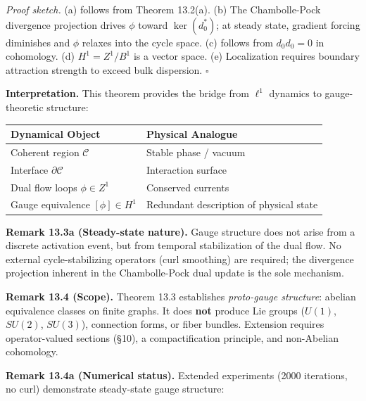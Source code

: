 \documentclass[
]{article}
\begin{document}
\emph{Proof sketch.} (a) follows from Theorem 13.2(a). (b) The
Chambolle-Pock divergence projection drives \(\phi\) toward
\(\ker(d_0^*)\); at steady state, gradient forcing diminishes and
\(\phi\) relaxes into the cycle space. (c) follows from \(d_0 d_0 = 0\)
in cohomology. (d) \(H^1 = Z^1/B^1\) is a vector space. (e) Localization
requires boundary attraction strength to exceed bulk dispersion.
\(\square\)

\textbf{Interpretation.} This theorem provides the bridge from
\(\ell^1\) dynamics to gauge-theoretic structure:

\begin{longtable}[]{@{}
  >{\raggedright\arraybackslash}p{}
  >{\raggedright\arraybackslash}p{}@{}}
\toprule\noalign{}
\begin{minipage}[b]{\linewidth}\raggedright
Dynamical Object
\end{minipage} & \begin{minipage}[b]{\linewidth}\raggedright
Physical Analogue
\end{minipage} \\
\midrule\noalign{}
\endhead
\bottomrule\noalign{}
\endlastfoot
Coherent region \(\mathcal{C}\) & Stable phase / vacuum \\
Interface \(\partial\mathcal{C}\) & Interaction surface \\
Dual flow loops \(\phi \in Z^1\) & Conserved currents \\
Gauge equivalence \([\phi] \in H^1\) & Redundant description of physical
state \\
\end{longtable}

\textbf{Remark 13.3a (Steady-state nature).} Gauge structure does not
arise from a discrete activation event, but from temporal stabilization
of the dual flow. No external cycle-stabilizing operators (curl
smoothing) are required; the divergence projection inherent in the
Chambolle-Pock dual update is the sole mechanism.

\textbf{Remark 13.4 (Scope).} Theorem 13.3 establishes \emph{proto-gauge
structure}: abelian equivalence classes on finite graphs. It does
\textbf{not} produce Lie groups (\(U(1)\), \(SU(2)\), \(SU(3)\)),
connection forms, or fiber bundles. Extension requires operator-valued
sections (§10), a compactification principle, and non-Abelian
cohomology.

\textbf{Remark 13.4a (Numerical status).} Extended experiments (2000
iterations, no curl) demonstrate steady-state gauge structure:
\end{document}
